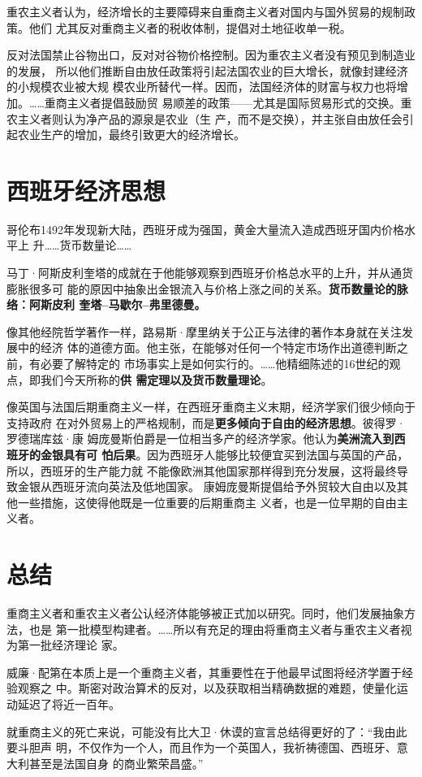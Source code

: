 重农主义者认为，经济增长的主要障碍来自重商主义者对国内与国外贸易的规制政策。他们
尤其反对重商主义者的税收体制，提倡对土地征收单一税。

反对法国禁止谷物出口，反对对谷物价格控制。因为重农主义者没有预见到制造业的发展，
所以他们推断自由放任政策将引起法国农业的巨大增长，就像封建经济的小规模农业被大规
模农业所替代一样。因而，法国经济体的财富与权力也将增加。……重商主义者提倡鼓励贸
易顺差的政策——尤其是国际贸易形式的交换。重农主义者则认为净产品的源泉是农业（生
产，而不是交换），并主张自由放任会引起农业生产的增加，最终引致更大的经济增长。

\section{西班牙经济思想}

哥伦布1492年发现新大陆，西班牙成为强国，黄金大量流入造成西班牙国内价格水平上
升……货币数量论……

马丁·阿斯皮利奎塔的成就在于他能够观察到西班牙价格总水平的上升，并从通货膨胀很多可
能的原因中抽象出金银流入与价格上涨之间的关系。\textbf{货币数量论的脉络：阿斯皮利
  奎塔--马歇尔--弗里德曼。}

像其他经院哲学著作一样，路易斯·摩里纳关于公正与法律的著作本身就在关注发展中的经济
体的道德方面。他主张，在能够对任何一个特定市场作出道德判断之前，有必要了解特定的
市场事实上是如何实行的。……他精细陈述的16世纪的观点，即我们今天所称的\textbf{供
  需定理以及货币数量理论}。

像英国与法国后期重商主义一样，在西班牙重商主义末期，经济学家们很少倾向于支持政府
在对外贸易上的严格规制，而是\textbf{更多倾向于自由的经济思想}。彼得罗·罗德瑞库兹·康
姆庞曼斯伯爵是一位相当多产的经济学家。他认为\textbf{美洲流入到西班牙的金银具有可
  怕后果}。因为西班牙人能够比较便宜买到法国与英国的产品，所以，西班牙的生产能力就
不能像欧洲其他国家那样得到充分发展，这将最终导致金银从西班牙流向英法及低地国家。
康姆庞曼斯提倡给予外贸较大自由以及其他一些措施，这使得他既是一位重要的后期重商主
义者，也是一位早期的自由主义者。

\section{总结}

重商主义者和重农主义者公认经济体能够被正式加以研究。同时，他们发展抽象方法，也是
第一批模型构建者。……所以有充足的理由将重商主义者与重农主义者视为第一批经济理论
家。

威廉·配第在本质上是一个重商主义者，其重要性在于他最早试图将经济学置于经验观察之
中。斯密对政治算术的反对，以及获取相当精确数据的难题，使量化运动延迟了将近一百年。

就重商主义的死亡来说，可能没有比大卫·休谟的宣言总结得更好的了：“我由此要斗胆声
明，不仅作为一个人，而且作为一个英国人，我祈祷德国、西班牙、意大利甚至是法国自身
的商业繁荣昌盛。”
